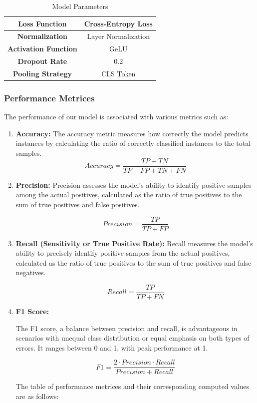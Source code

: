 \begin{table}[h]
\begin{tabular}{|c|c|}
        \hline
        \textbf{Loss Function}                  & Cross-Entropy Loss  \\
        \hline
        \textbf{Normalization}                  & Layer Normalization \\
        \hline
        \textbf{Activation Function}            & GeLU                \\
        \hline
        \textbf{Dropout Rate }                  & 0.2                 \\
        \hline
        \textbf{Pooling Strategy }              & CLS Token           \\
        \hline
    \end{tabular}
    \caption{Model Parameters}
    \label{tab:model-parameters}
\end{table}
\newpage
\subsubsection{Performance Metrices}

The performance of our model is associated with various metrics such as:
\begin{enumerate}
    \item \textbf{Accuracy:}
    The accuracy metric measures how correctly the model predicts instances by calculating the ratio of correctly classified instances to the total samples.
    \[ Accuracy = \frac{TP + TN}{TP + FP + TN + FN} \]
    
    \item \textbf{Precision:}
    Precision assesses the model's ability to identify positive samples among the actual positives, calculated as the ratio of true positives to the sum of true positives and false positives.
    
    \[ Precision = \frac{TP}{TP + FP} \]
    
    \item \textbf{Recall (Sensitivity or True Positive Rate):}
    Recall measures the model's ability to precisely identify positive samples from the actual positives, calculated as the ratio of true positives to the sum of true positives and false negatives.
    
    \[ Recall = \frac{TP}{TP + FN} \]
    
    
    \item \textbf{F1 Score:}
    
    The F1 score, a balance between precision and recall, is advantageous in scenarios with unequal class distribution or equal emphasis on both types of errors. It ranges between 0 and 1, with peak performance at 1.
    
    \[ F1 = \frac{2 \cdot Precision \cdot Recall}{Precision + Recall} \]

    The table of performance metrices and their corresponding computed values are as follows:
\end{enumerate}
    
